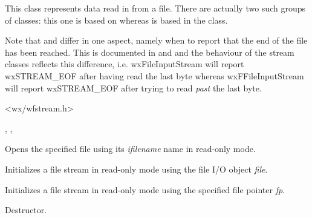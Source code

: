 This class represents data read in from a file. There are actually
two such groups of classes: this one is based on  
whereas  is based in
the  class.

Note that  and  differ
in one aspect, namely when to report that the end of the file has been
reached. This is documented in  and 
 and the behaviour of the stream
classes reflects this difference, i.e. wxFileInputStream will report
wxSTREAM\_EOF after having read the last byte whereas wxFFileInputStream
will report wxSTREAM\_EOF after trying to read {\it past} the last byte.




<wx/wfstream.h>


, , 




Opens the specified file using its {\it ifilename} name in read-only mode.


Initializes a file stream in read-only mode using the file I/O object {\it file}.


Initializes a file stream in read-only mode using the specified file pointer {\it fp}.



Destructor.



